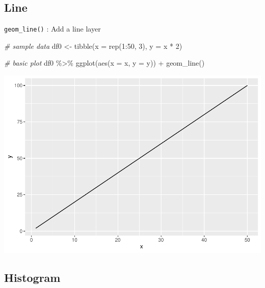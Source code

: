 \documentclass[
]{book}
\newenvironment{Shaded}{\begin{snugshade}}{\end{snugshade}}
\newcommand{\AttributeTok}[1]{\textcolor[rgb]{0.77,0.63,0.00}{#1}}
\newcommand{\CommentTok}[1]{\textcolor[rgb]{0.56,0.35,0.01}{\textit{#1}}}
\newcommand{\DecValTok}[1]{\textcolor[rgb]{0.00,0.00,0.81}{#1}}
\newcommand{\FunctionTok}[1]{\textcolor[rgb]{0.00,0.00,0.00}{#1}}
\newcommand{\NormalTok}[1]{#1}
\newcommand{\OtherTok}[1]{\textcolor[rgb]{0.56,0.35,0.01}{#1}}
\newcommand{\SpecialCharTok}[1]{\textcolor[rgb]{0.00,0.00,0.00}{#1}}
\begin{document}
\hypertarget{line}{%
\subsection{Line}\label{line}}

\texttt{geom\_line()} : Add a line layer

\begin{Shaded}
\begin{Highlighting}[]
\CommentTok{\# sample data}
\NormalTok{df0 }\OtherTok{\textless{}{-}} \FunctionTok{tibble}\NormalTok{(}\AttributeTok{x =} \FunctionTok{rep}\NormalTok{(}\DecValTok{1}\SpecialCharTok{:}\DecValTok{50}\NormalTok{, }\DecValTok{3}\NormalTok{),}
              \AttributeTok{y =}\NormalTok{ x }\SpecialCharTok{*} \DecValTok{2}\NormalTok{)}

\CommentTok{\# basic plot}
\NormalTok{df0 }\SpecialCharTok{\%\textgreater{}\%} 
  \FunctionTok{ggplot}\NormalTok{(}\FunctionTok{aes}\NormalTok{(}\AttributeTok{x =}\NormalTok{ x,}
             \AttributeTok{y =}\NormalTok{ y)) }\SpecialCharTok{+}
  \FunctionTok{geom\_line}\NormalTok{()}
\end{Highlighting}
\end{Shaded}

\begin{center}\includegraphics{biostats_files/figure-latex/unnamed-chunk-112-1} \end{center}

\hypertarget{histogram}{%
\subsection{Histogram}\label{histogram}}
\end{document}
